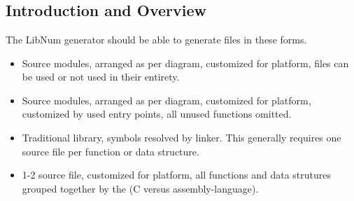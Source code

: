 \chapter[\clgnzerotitleemph{}]{\clgnzerolongtitleemph{}}
\chaptermark{\clgnzeroshorttitlenoemph{}}
\label{clgn0}

\section{Introduction and Overview}
\label{clgn0:siov0}

The LibNum generator should be able to generate
files in these forms.

\begin{itemize}
\item Source modules, arranged as per diagram, customized
      for platform,
      files can be used or not used in their entirety.
\item Source modules, arranged as per diagram, customized
      for platform, customized by used entry points,
      all unused functions omitted.
\item Traditional library, symbols resolved by linker.
      This generally requires one source file per function
      or data structure.
\item 1-2 source file, customized for platform, all functions
      and data strutures grouped together by the (C versus
      assembly-language).
\end{itemize}

